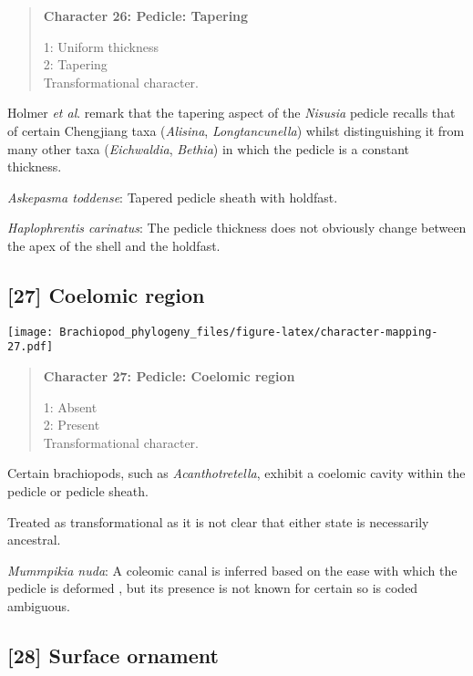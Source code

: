 \documentclass[openany]{book}
\theoremstyle{definition}
\theoremstyle{definition}
\theoremstyle{definition}
\theoremstyle{remark}
\begin{document}
\begin{quote}
\textbf{Character 26: Pedicle: Tapering}

1: Uniform thickness\\
2: Tapering\\
Transformational character.
\end{quote}

Holmer \emph{et al}. \citeyearpar{Holmer2018Theattachment} remark that
the tapering aspect of the \emph{Nisusia} pedicle recalls that of
certain Chengjiang taxa (\emph{Alisina}, \emph{Longtancunella}) whilst
distinguishing it from many other taxa (\emph{Eichwaldia},
\emph{Bethia}) in which the pedicle is a constant thickness.

\hypertarget{Askepasma_toddense-coding-26}{}
\emph{Askepasma toddense}: Tapered pedicle sheath with holdfast.

\hypertarget{Haplophrentis_carinatus-coding-26}{}
\emph{Haplophrentis carinatus}: The pedicle thickness does not obviously
change between the apex of the shell and the holdfast.

\subsection*{{[}27{]} Coelomic region}\label{coelomic-region}

\texttt{[image: Brachiopod\_phylogeny\_files/figure-latex/character-mapping-27.pdf]}

\begin{quote}
\textbf{Character 27: Pedicle: Coelomic region}

1: Absent\\
2: Present\\
Transformational character.
\end{quote}

Certain brachiopods, such as \emph{Acanthotretella}, exhibit a coelomic
cavity within the pedicle or pedicle sheath.

Treated as transformational as it is not clear that either state is
necessarily ancestral.

\hypertarget{Mummpikia_nuda-coding-27}{}
\emph{Mummpikia nuda}: A coleomic canal is inferred based on the ease
with which the pedicle is deformed
\citep{Holmer2018Evolutionarysignificance}, but its presence is not
known for certain so is coded ambiguous.

\subsection*{{[}28{]} Surface ornament}\label{surface-ornament-1}
\end{document}
